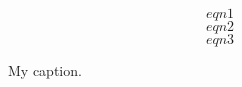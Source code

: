 \documentclass{article}
\begin{document}
\begin{figure}[ht]
	\begin{mdframed}
		\[ eqn 1 \]
		\[ eqn 2 \]
		\[ eqn 3 \]
	\end{mdframed}
	\caption{\label{myfig} My caption.}
\end{figure}
\end{document}
